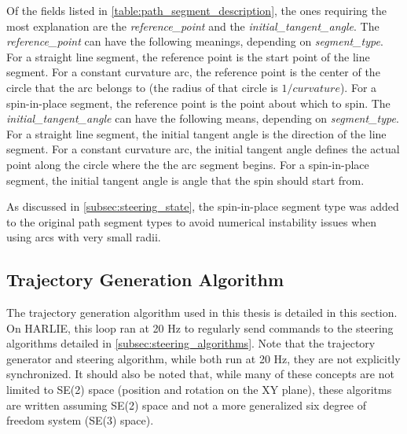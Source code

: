 Of the fields listed in \autoref{table:path_segment_description}, the ones requiring the most explanation are the \emph{reference\_point} and the \emph{initial\_tangent\_angle}. The \emph{reference\_point} can have the following meanings, depending on \emph{segment\_type}. For a straight line segment, the reference point is the start point of the line segment. For a constant curvature arc, the reference point is the center of the circle that the arc belongs to (the radius of that circle is $1/curvature$). For a spin-in-place segment, the reference point is the point about which to spin. The \emph{initial\_tangent\_angle} can have the following means, depending on \emph{segment\_type}. For a straight line segment, the initial tangent angle is the direction of the line segment. For a constant curvature arc, the initial tangent angle defines the actual point along the circle where the the arc segment begins. For a spin-in-place segment, the initial tangent angle is angle that the spin should start from.

As discussed in \autoref{subsec:steering_state}, the spin-in-place segment type was added to the original path segment types to avoid numerical instability issues when using arcs with very small radii.

\subsection{Trajectory Generation Algorithm}\label{subsec:trajectory_generation_algorithm}

The trajectory generation algorithm used in this thesis is detailed in this section. On HARLIE, this loop ran at 20 Hz to regularly send commands to the steering algorithms detailed in \autoref{subsec:steering_algorithms}. Note that the trajectory generator and steering algorithm, while both run at 20 Hz, they are not explicitly synchronized. It should also be noted that, while many of these concepts are not limited to SE(2) space (position and rotation on the XY plane), these algoritms are written assuming SE(2) space and not a more generalized six degree of freedom system (SE(3) space).


